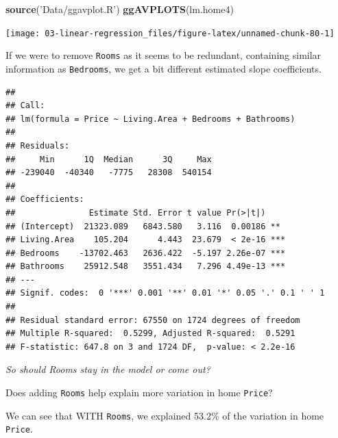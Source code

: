 \documentclass[
]{book}
\newenvironment{Shaded}{\begin{snugshade}}{\end{snugshade}}
\newcommand{\KeywordTok}[1]{\textcolor[rgb]{0.13,0.29,0.53}{\textbf{#1}}}
\newcommand{\NormalTok}[1]{#1}
\newcommand{\OperatorTok}[1]{\textcolor[rgb]{0.81,0.36,0.00}{\textbf{#1}}}
\newcommand{\StringTok}[1]{\textcolor[rgb]{0.31,0.60,0.02}{#1}}
\begin{document}
\begin{Shaded}
\begin{Highlighting}[]
\KeywordTok{source}\NormalTok{(}\StringTok{'Data/ggavplot.R'}\NormalTok{)}
\KeywordTok{ggAVPLOTS}\NormalTok{(lm.home4)}
\end{Highlighting}
\end{Shaded}

\begin{center}\texttt{[image: 03-linear-regression\_files/figure-latex/unnamed-chunk-80-1]} \end{center}

If we were to remove \texttt{Rooms} as it seems to be redundant, containing similar information as \texttt{Bedrooms}, we get a bit different estimated slope coefficients.

\begin{Shaded}
\end{Shaded}

\begin{verbatim}
## 
## Call:
## lm(formula = Price ~ Living.Area + Bedrooms + Bathrooms)
## 
## Residuals:
##     Min      1Q  Median      3Q     Max 
## -239040  -40340   -7775   28308  540154 
## 
## Coefficients:
##               Estimate Std. Error t value Pr(>|t|)    
## (Intercept)  21323.089   6843.580   3.116  0.00186 ** 
## Living.Area    105.204      4.443  23.679  < 2e-16 ***
## Bedrooms    -13702.463   2636.422  -5.197 2.26e-07 ***
## Bathrooms    25912.548   3551.434   7.296 4.49e-13 ***
## ---
## Signif. codes:  0 '***' 0.001 '**' 0.01 '*' 0.05 '.' 0.1 ' ' 1
## 
## Residual standard error: 67550 on 1724 degrees of freedom
## Multiple R-squared:  0.5299,	Adjusted R-squared:  0.5291 
## F-statistic: 647.8 on 3 and 1724 DF,  p-value: < 2.2e-16
\end{verbatim}

\emph{So should Rooms stay in the model or come out?}

Does adding \texttt{Rooms} help explain more variation in home \texttt{Price}?

We can see that WITH \texttt{Rooms}, we explained 53.2\% of the variation in home \texttt{Price}.
\end{document}

